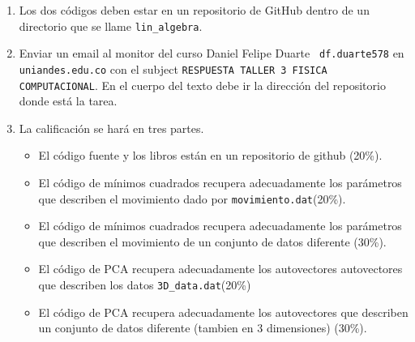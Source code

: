 \documentclass{article}
\begin{document}
\begin{enumerate}
\item
Los dos c\'odigos deben estar en un repositorio de GitHub dentro de
un directorio que se llame \verb"lin_algebra".

\item
Enviar un email al monitor del curso Daniel Felipe Duarte {\tt
  df.duarte578} en {\tt uniandes.edu.co} con el subject
\verb"RESPUESTA TALLER 3 FISICA COMPUTACIONAL". En el cuerpo del texto
debe ir la direcci\'on del repositorio donde est\'a la tarea. 

\item
La calificaci\'on se har\'a en tres partes.
\begin{itemize}
\item El c\'odigo fuente y los libros est\'an en un repositorio de
  github (20\%). 
\item El c\'odigo de m\'inimos cuadrados recupera adecuadamente los
  par\'ametros que describen el movimiento dado por
  \verb"movimiento.dat"(20\%).
\item El c\'odigo de m\'inimos cuadrados recupera adecuadamente los
  par\'ametros que describen el movimiento de un conjunto de datos
  diferente (30\%).
\item El c\'odigo de PCA recupera adecuadamente los autovectores
  autovectores que describen los datos \verb"3D_data.dat"(20\%) 
\item El c\'odigo de PCA recupera adecuadamente los autovectores que
  describen un conjunto de datos diferente (tambien en 3 dimensiones) (30\%).
\end{itemize}
\end{enumerate}
\end{document}
